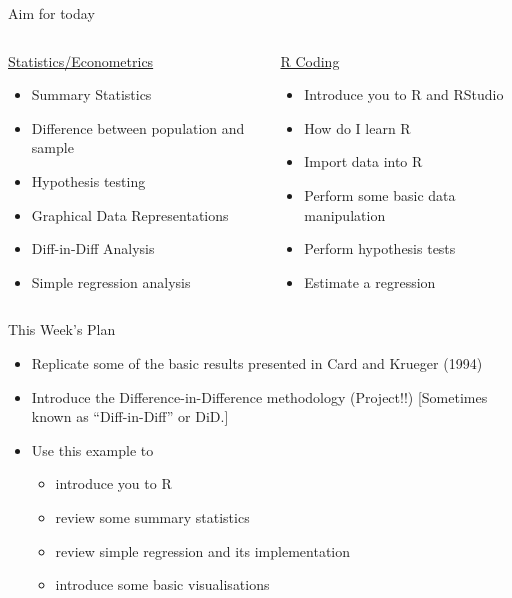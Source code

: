 \documentclass[
  ignorenonframetext,
]{beamer}
\begin{document}
\begin{frame}{Aim for today}
\label{aim-for-today}
\begin{columns}
  
  \begin{column}{0.5\textwidth}
    \underline{Statistics/Econometrics}
    \begin{itemize}
      \item Summary Statistics
      \item Difference between population and sample
      \item Hypothesis testing
      \item Graphical Data Representations
      \item Diff-in-Diff Analysis
      \item Simple regression analysis
    \end{itemize}
  \end{column}
  \begin{column}{0.5\textwidth}
    \underline{R Coding}
    \begin{itemize}
      \item Introduce you to R and RStudio
      \item How do I learn R
      \item Import data into R
      \item Perform some basic data manipulation
      \item Perform hypothesis tests
      \item Estimate a regression
    \end{itemize}
  \end{column}
    
\end{columns}
\end{frame}

\begin{frame}{This Week's Plan}
\label{this-weeks-plan}
\begin{itemize}
  \item Replicate some of the basic results presented in Card and Krueger (1994)
  \item Introduce the Difference-in-Difference methodology (Project!!) [Sometimes known as “Diff-in-Diff” or DiD.]
  \item Use this example to 
    \begin{itemize}
      \item introduce you to R
      \item review some summary statistics
      \item review simple regression and its implementation
      \item introduce some basic visualisations
    \end{itemize}
\end{itemize}
\end{frame}
\end{document}
